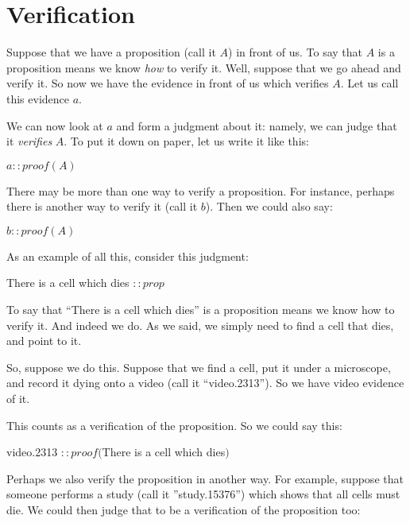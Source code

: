 \documentclass[../../../main.tex]{subfiles}
\begin{document}
\section{Verification}

Suppose that we have a proposition (call it $A$) in front of us. To say that $A$ is a proposition means we know \emph{how} to verify it. Well, suppose that we go ahead and verify it. So now we have the evidence in front of us which verifies $A$. Let us call this evidence $a$. 

We can now look at $a$ and form a judgment about it: namely, we can judge that it \emph{verifies} $A$. To put it down on paper, let us write it like this:

\begin{center}
  $a :: proof(A)$
\end{center}

\noindent
There may be more than one way to verify a proposition. For instance, perhaps there is another way to verify it (call it $b$). Then we could also say:

\begin{center}
  $b :: proof(A)$
\end{center}

\noindent
As an example of all this, consider this judgment:

\begin{center}
  There is a cell which dies $:: prop$
\end{center}

\noindent
To say that ``There is a cell which dies'' is a proposition means we know how to verify it. And indeed we do. As we said, we simply need to find a cell that dies, and point to it.

So, suppose we do this. Suppose that we find a cell, put it under a microscope, and record it dying onto a video (call it ``video.2313''). So we have video evidence of it. 

This counts as a verification of the proposition. So we could say this:

\begin{center}
  video.2313 $:: proof($There is a cell which dies$)$
\end{center}

\noindent
Perhaps we also verify the proposition in another way. For example, suppose that someone performs a study (call it ''study.15376'') which shows that all cells must die. We could then judge that to be a verification of the proposition too:
\end{document}
